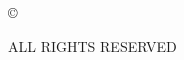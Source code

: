 \clearpage
\thispagestyle{plain}
\vspace*{3.4in}
\begin{center}
\copyright\ \CopyrightYear\par
\vspace{0.15in}
\ThesisAuthor\par
\vspace{0.15in}
ALL RIGHTS RESERVED
\end{center}
\clearpage
